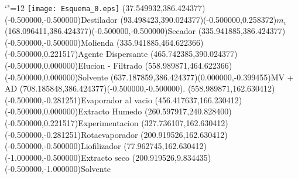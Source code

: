 \documentclass[12pt]{article}
\begin{document}
\makeatletter%
\let\ASYencoding\f@encoding%
\let\ASYfamily\f@family%
\let\ASYseries\f@series%
\let\ASYshape\f@shape%
\makeatother%
{\catcode`"=12%
\texttt{[image: Esquema\_0.eps]}%
}%
\kern -711.318898pt%
\color{ASYcolor}
\fontsize{12.000000}{14.400000}\selectfont
\usefont{\ASYencoding}{\ASYfamily}{\ASYseries}{\ASYshape}%
\ASYalign(37.549932,386.424377)(-0.500000,-0.500000){Destilador}%
\color{ASYcolor}
\fontsize{12.000000}{14.400000}\selectfont
\ASYalign(93.498423,390.024377)(-0.500000,0.258372){$m_v$}%
\color{ASYcolor}
\fontsize{12.000000}{14.400000}\selectfont
\ASYalign(168.096411,386.424377)(-0.500000,-0.500000){Secador}%
\color{ASYcolor}
\fontsize{12.000000}{14.400000}\selectfont
\ASYalign(335.941885,386.424377)(-0.500000,-0.500000){Molienda}%
\color{ASYcolor}
\fontsize{12.000000}{14.400000}\selectfont
\ASYalign(335.941885,464.622366)(-0.500000,0.221517){Agente Dispersante}%
\color{ASYcolor}
\fontsize{12.000000}{14.400000}\selectfont
\ASYalign(465.742385,390.024377)(-0.500000,0.000000){Elucion - Filtrado}%
\color{ASYcolor}
\fontsize{12.000000}{14.400000}\selectfont
\ASYalign(558.989871,464.622366)(-0.500000,0.000000){Solvente}%
\color{ASYcolor}
\fontsize{12.000000}{14.400000}\selectfont
\ASYalign(637.187859,386.424377)(0.000000,-0.399455){MV + AD}%
\color{ASYcolor}
\fontsize{12.000000}{14.400000}\selectfont
\ASYalign(708.185848,386.424377)(-0.500000,-0.500000){.}%
\color{ASYcolor}
\fontsize{12.000000}{14.400000}\selectfont
\ASYalign(558.989871,162.630412)(-0.500000,-0.281251){Evaporador al vacio}%
\color{ASYcolor}
\fontsize{12.000000}{14.400000}\selectfont
\ASYalign(456.417637,166.230412)(-0.500000,0.000000){Extracto Humedo}%
\color{ASYcolor}
\fontsize{12.000000}{14.400000}\selectfont
\ASYalign(260.597917,240.828400)(-0.500000,0.221517){Experimentacion}%
\color{ASYcolor}
\fontsize{12.000000}{14.400000}\selectfont
\ASYalign(327.736107,162.630412)(-0.500000,-0.281251){Rotaevaporador}%
\color{ASYcolor}
\fontsize{12.000000}{14.400000}\selectfont
\ASYalign(200.919526,162.630412)(-0.500000,-0.500000){Liofilizador}%
\color{ASYcolor}
\fontsize{12.000000}{14.400000}\selectfont
\ASYalign(77.962745,162.630412)(-1.000000,-0.500000){Extracto seco}%
\color{ASYcolor}
\fontsize{12.000000}{14.400000}\selectfont
\ASYalign(200.919526,9.834435)(-0.500000,-1.000000){Solvente}%
\end{document}

